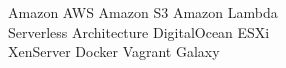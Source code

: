
Amazon AWS \textbullet{} Amazon S3 \textbullet{} Amazon Lambda \\
Serverless Architecture \textbullet{} DigitalOcean \textbullet{} ESXi \\
XenServer \textbullet{} Docker \textbullet{} Vagrant \textbullet{} Galaxy